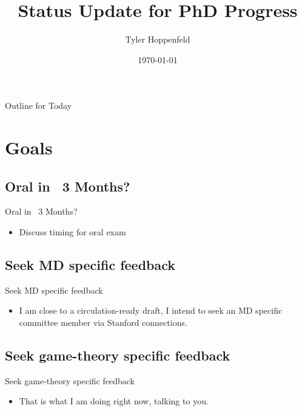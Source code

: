 \documentclass{beamer}
\title[Phd Status]{Status Update for PhD Progress}
\author{Tyler Hoppenfeld}
\institute{UC Davis}
\date{\today}
\begin{document}
\begin{frame}
  \titlepage
\end{frame}

\begin{frame}{Outline for Today}
  \tableofcontents
\end{frame}

\section{Goals}

\subsection{Oral in ~3 Months?}

\begin{frame}{Oral in ~3 Months?}
	\begin{itemize}
		\item Discuss timing for oral exam
	\end{itemize}
\end{frame}

\subsection{Seek MD specific feedback}

\begin{frame}{Seek MD specific feedback}
	\begin{itemize}
		\item I am close to a circulation-ready draft, I intend to seek an MD specific committee member via Stanford connections.
	\end{itemize}
\end{frame}


\subsection{Seek game-theory specific feedback}

\begin{frame}{Seek game-theory specific feedback}
	\begin{itemize}
		\item That is what I am doing right now, talking to you.
	\end{itemize}
\end{frame}
\end{document}
